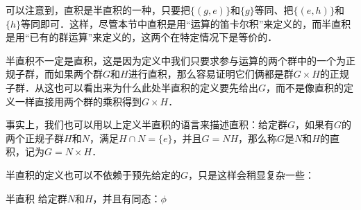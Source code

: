 可以注意到，直积是半直积的一种，只要把$\{(g, e)\}$和$\{g\}$等同、把$\{(e, h)\}$和$\{h\}$等同即可．这样，尽管本节中直积是用“运算的笛卡尔积”来定义的，而半直积是用“已有的群运算”来定义的，这两个在特定情况下是等价的．

半直积不一定是直积，这是因为定义中我们只要求参与运算的两个群中的一个为正规子群，而如果两个群$G$和$H$进行直积，那么容易证明它们俩都是群$G\times H$的正规子群．从这也可以看出来为什么此处半直积的定义要先给出$G$，而不是像直积的定义一样直接用两个群的乘积得到$G\times H$．

事实上，我们也可以用以上定义半直积的语言来描述直积：给定群$G$，如果有$G$的两个正规子群$H$和$N$，满足$H\cap N=\{e\}$，并且$G=NH$，那么称$G$是$N$和$H$的直积，记为$G=N\times H$．

半直积的定义也可以不依赖于预先给定的$G$，只是这样会稍显复杂一些：

\begin{definition}{半直积}
给定群$N$和$H$，并且有同态：$\phi$
\end{definition}














